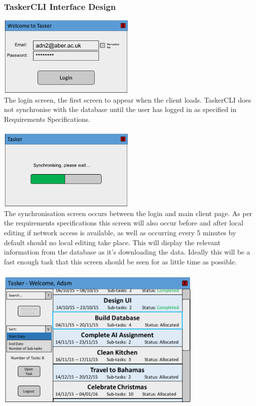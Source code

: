 \documentclass{project}
\begin{document}
\subsubsection{TaskerCLI Interface Design} 
\includegraphics[width=0.5\textwidth, center]{images/5.2/TaskerCLILogin} \\
The login screen, the first screen to appear when the client loads. TaskerCLI does not synchronise with the database until the user has logged in as specified in Requirements Specifications.\cite{se.qa.rs} \\~\\
\newline
\includegraphics[width=0.5\textwidth, center]{images/5.2/TaskerCLILoading} \\
The synchronisation screen occurs between the login and main client page. As per the requirements specifications \cite{se.qa.rs} this screen will also occur before and after local editing if network access is available, as well as occurring every 5 minutes by default should no local editing take place. This will display the relevant information from the database as it's downloading the data. Ideally this will be a fast enough task that this screen should be seen for as little time as possible. \\~\\
\newline
\includegraphics[width=0.75\textwidth, center]{images/5.2/TaskerCLIMainScreen} \\
\end{document}
